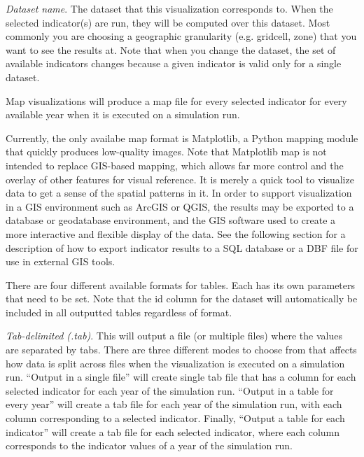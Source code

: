 \emph{Dataset name}. The dataset that this visualization corresponds
to. When the selected indicator(s) are run, they will be computed over
this dataset. Most commonly you are choosing a geographic granularity
(e.g. gridcell, zone) that you want to see the results at. Note that
when you change the dataset, the set of available indicators changes
because a given indicator is valid only for a single dataset.


Map visualizations will produce a map file for every selected
indicator for every available year when it is executed on a
simulation run. 

Currently, the only availabe map format is Matplotlib, a Python mapping
module that quickly produces low-quality images. Note that Matplotlib
map is not intended to replace GIS-based mapping, which allows far more
control and the overlay of other features for visual reference.  It is
merely a quick tool to visualize data to get a sense of the spatial
patterns in it. In order to support visualization in a GIS environment
such as ArcGIS or QGIS, the results may be exported to a database or
geodatabase environment, and the GIS software used to create a more
interactive and flexible display of the data. See the following section
for a description of how to export indicator results to a SQL database
or a DBF file for use in external GIS tools.


There are four different available formats for tables. Each has its
own parameters that need to be set. Note that the id column for the
dataset will automatically be included in all outputted tables
regardless of format.

\emph{Tab-delimited (.tab)}. This will output a file (or multiple
files) where the values are separated by tabs. There are three
different modes to choose from that affects how data is split across
files when the visualization is executed on a simulation run.
``Output in a single file'' will create single tab file that has a
column for each selected indicator for each year of the simulation
run. ``Output in a table for every year'' will create a tab file
for each year of the simulation run, with each column
corresponding to a selected indicator. Finally, 
``Output a table for each indicator'' will create a tab file for
each selected indicator, where each column
corresponds to the indicator values of a year of the
simulation run.

